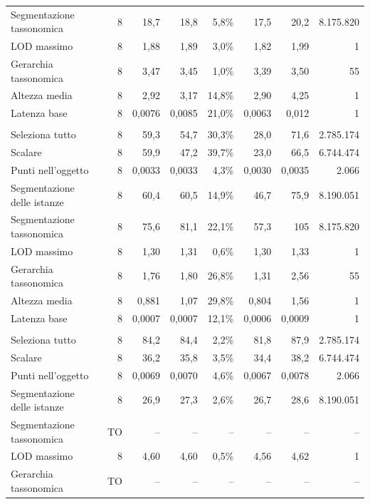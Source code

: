 \begin{small}
\begin{longtable}{lrrrrrr r}
\quad Segmentazione tassonomica & 8 & 18,7 & 18,8 & 5,8\% & 17,5 & 20,2 & 8.175.820 \\
\quad LOD massimo & 8 & 1,88 & 1,89 & 3,0\% & 1,82 & 1,99 & 1 \\
\quad Gerarchia tassonomica & 8 & 3,47 & 3,45 & 1,0\% & 3,39 & 3,50 & 55 \\
\quad Altezza media & 8 & 2,92 & 3,17 & 14,8\% & 2,90 & 4,25 & 1 \\
\quad Latenza base & 8 & 0,0076 & 0,0085 & 21,0\% & 0,0063 & 0,012 & 1 \\
\addlinespace
\multicolumn{8}{l}{\textbf{Owlready2}}\\
\quad Seleziona tutto & 8 & 59,3 & 54,7 & 30,3\% & 28,0 & 71,6 & 2.785.174 \\
\quad Scalare & 8 & 59,9 & 47,2 & 39,7\% & 23,0 & 66,5 & 6.744.474 \\
\quad Punti nell'oggetto & 8 & 0,0033 & 0,0033 & 4,3\% & 0,0030 & 0,0035 & 2.066 \\
\quad Segmentazione delle istanze & 8 & 60,4 & 60,5 & 14,9\% & 46,7 & 75,9 & 8.190.051 \\
\quad Segmentazione tassonomica & 8 & 75,6 & 81,1 & 22,1\% & 57,3 & 105 & 8.175.820 \\
\quad LOD massimo & 8 & 1,30 & 1,31 & 0,6\% & 1,30 & 1,33 & 1 \\
\quad Gerarchia tassonomica & 8 & 1,76 & 1,80 & 26,8\% & 1,31 & 2,56 & 55 \\
\quad Altezza media & 8 & 0,881 & 1,07 & 29,8\% & 0,804 & 1,56 & 1 \\
\quad Latenza base & 8 & 0,0007 & 0,0007 & 12,1\% & 0,0006 & 0,0009 & 1 \\
\addlinespace
\multicolumn{8}{l}{\textbf{Oxigraph}}\\
\quad Seleziona tutto & 8 & 84,2 & 84,4 & 2,2\% & 81,8 & 87,9 & 2.785.174 \\
\quad Scalare & 8 & 36,2 & 35,8 & 3,5\% & 34,4 & 38,2 & 6.744.474 \\
\quad Punti nell'oggetto & 8 & 0,0069 & 0,0070 & 4,6\% & 0,0067 & 0,0078 & 2.066 \\
\quad Segmentazione delle istanze & 8 & 26,9 & 27,3 & 2,6\% & 26,7 & 28,6 & 8.190.051 \\
\quad Segmentazione tassonomica & \textsf{TO} & -- & -- & -- & -- & -- & -- \\
\quad LOD massimo & 8 & 4,60 & 4,60 & 0,5\% & 4,56 & 4,62 & 1 \\
\quad Gerarchia tassonomica & \textsf{TO} & -- & -- & -- & -- & -- & -- \\

\end{longtable}
\end{small}
